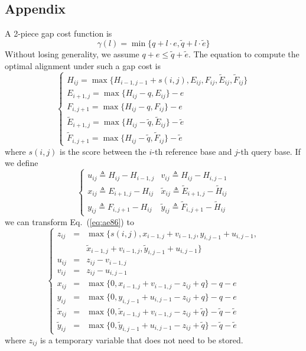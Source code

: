\documentclass{bioinfo}
\begin{document}
\begin{methods}
\section*{Appendix}
A 2-piece gap cost function is
\[
\gamma(l)=\min\{q+l\cdot e,\tilde{q}+l\cdot\tilde{e}\}
\]
Without losing generality, we assume $q+e\le\tilde{q}+\tilde{e}$. The equation
to compute the optimal alignment under such a gap cost is~\citep{Gotoh:1990aa}
\begin{equation}\label{eq:ae86}
\left\{\begin{array}{l}
H_{ij} = \max\{H_{i-1,j-1}+s(i,j),E_{ij},F_{ij},\tilde{E}_{ij},\tilde{F}_{ij}\}\\
E_{i+1,j}= \max\{H_{ij}-q,E_{ij}\}-e\\
F_{i,j+1}= \max\{H_{ij}-q,F_{ij}\}-e\\
\tilde{E}_{i+1,j}= \max\{H_{ij}-\tilde{q},\tilde{E}_{ij}\}-\tilde{e}\\
\tilde{F}_{i,j+1}= \max\{H_{ij}-\tilde{q},\tilde{F}_{ij}\}-\tilde{e}
\end{array}\right.
\end{equation}
where $s(i,j)$ is the score between the $i$-th reference base and $j$-th query
base. If we define
\[
\left\{\begin{array}{ll}
u_{ij}\triangleq H_{ij}-H_{i-1,j} & v_{ij}\triangleq H_{ij}-H_{i,j-1} \\
x_{ij}\triangleq E_{i+1,j}-H_{ij} & \tilde{x}_{ij}\triangleq \tilde{E}_{i+1,j}-\tilde{H}_{ij} \\
y_{ij}\triangleq F_{i,j+1}-H_{ij} & \tilde{y}_{ij}\triangleq \tilde{F}_{i,j+1}-\tilde{H}_{ij}
\end{array}\right.
\]
we can transform Eq.~(\ref{eq:ae86}) to
\begin{equation}\label{eq:suzuki}
\left\{\begin{array}{lll}
z_{ij}&=&\max\{s(i,j),x_{i-1,j}+v_{i-1,j},y_{i,j-1}+u_{i,j-1},\\
&&\tilde{x}_{i-1,j}+v_{i-1,j},\tilde{y}_{i,j-1}+u_{i,j-1}\}\\
u_{ij}&=&z_{ij}-v_{i-1,j}\\
v_{ij}&=&z_{ij}-u_{i,j-1}\\
x_{ij}&=&\max\{0,x_{i-1,j}+v_{i-1,j}-z_{ij}+q\}-q-e\\
y_{ij}&=&\max\{0,y_{i,j-1}+u_{i,j-1}-z_{ij}+q\}-q-e\\
\tilde{x}_{ij}&=&\max\{0,\tilde{x}_{i-1,j}+v_{i-1,j}-z_{ij}+\tilde{q}\}-\tilde{q}-\tilde{e}\\
\tilde{y}_{ij}&=&\max\{0,\tilde{y}_{i,j-1}+u_{i,j-1}-z_{ij}+\tilde{q}\}-\tilde{q}-\tilde{e}
\end{array}\right.
\end{equation}
where $z_{ij}$ is a temporary variable that does not need to be stored.


\end{methods}
\end{document}
